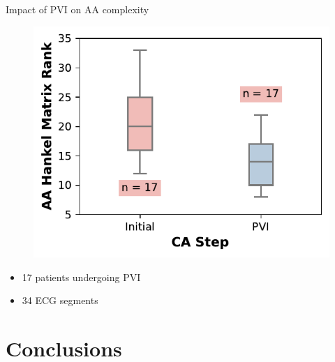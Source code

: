 \documentclass{beamer}
\begin{document}
	\begin{frame}{Impact of PVI on AA complexity}

		\vspace{-0.5cm}
		\begin{figure}[h]
			\centering
			\includegraphics[scale=0.9]{figures/boxplot_PVI.pdf}
		\end{figure}
		\vspace{-0.5cm}
		\begin{itemize}
			\item 17 patients undergoing PVI
			\item 34 ECG segments
		\end{itemize}
	\end{frame}

\section{Conclusions}
\end{document}
